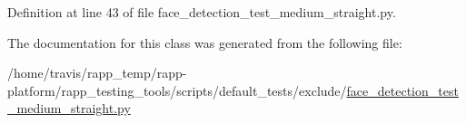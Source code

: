 Definition at line 43 of file face\-\_\-detection\-\_\-test\-\_\-medium\-\_\-straight.\-py.



The documentation for this class was generated from the following file\-:\begin{DoxyCompactItemize}
\item 
/home/travis/rapp\-\_\-temp/rapp-\/platform/rapp\-\_\-testing\-\_\-tools/scripts/default\-\_\-tests/exclude/\hyperlink{face__detection__test__medium__straight_8py}{face\-\_\-detection\-\_\-test\-\_\-medium\-\_\-straight.\-py}\end{DoxyCompactItemize}
